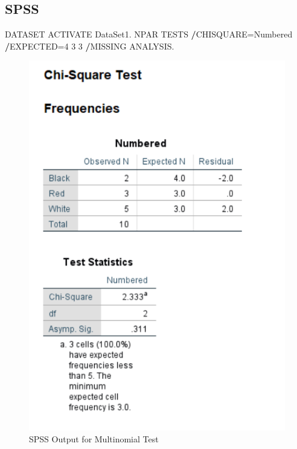 \documentclass[
]{book}
\newenvironment{Shaded}{\begin{snugshade}}{\end{snugshade}}
\newcommand{\DecValTok}[1]{\textcolor[rgb]{0.00,0.00,0.81}{#1}}
\newcommand{\NormalTok}[1]{#1}
\newcommand{\OperatorTok}[1]{\textcolor[rgb]{0.81,0.36,0.00}{\textbf{#1}}}
\begin{document}
\hypertarget{spss-1}{%
\subsection{SPSS}\label{spss-1}}

\begin{Shaded}
\begin{Highlighting}[]
\NormalTok{DATASET ACTIVATE DataSet1.}
\NormalTok{NPAR TESTS}
  \OperatorTok{/}\NormalTok{CHISQUARE=Numbered}
  \OperatorTok{/}\NormalTok{EXPECTED=}\DecValTok{4} \DecValTok{3} \DecValTok{3}
  \OperatorTok{/}\NormalTok{MISSING ANALYSIS.}
\end{Highlighting}
\end{Shaded}

\begin{figure}[!h]
\includegraphics{Screenshots/Multinomial Test/mntSPSS} \caption{\label{fig:mntSPSS}SPSS Output for Multinomial Test}\label{fig:mntSPSS}
\end{figure}
\end{document}
